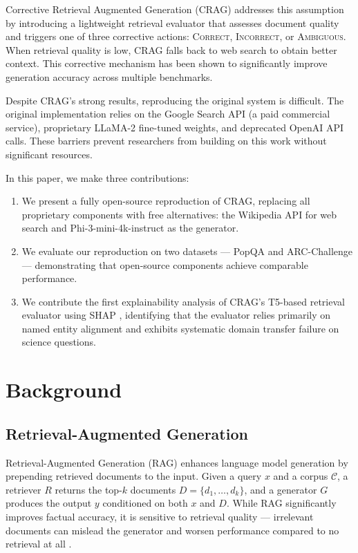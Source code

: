 \documentclass[11pt]{article}
\begin{document}
Corrective Retrieval Augmented Generation (CRAG) \cite{yan2024corrective} addresses this
assumption by introducing a lightweight retrieval evaluator that assesses document quality and
triggers one of three corrective actions: \textsc{Correct}, \textsc{Incorrect}, or
\textsc{Ambiguous}. When retrieval quality is low, CRAG falls back to web search to obtain better
context. This corrective mechanism has been shown to significantly improve generation accuracy
across multiple benchmarks.

Despite CRAG's strong results, reproducing the original system is difficult. The original
implementation relies on the Google Search API (a paid commercial service), proprietary LLaMA-2
fine-tuned weights, and deprecated OpenAI API calls. These barriers prevent researchers from
building on this work without significant resources.

In this paper, we make three contributions:
\begin{enumerate}
    \item We present a fully open-source reproduction of CRAG, replacing all proprietary
          components with free alternatives: the Wikipedia API for web search and
          Phi-3-mini-4k-instruct as the generator.
    \item We evaluate our reproduction on two datasets --- PopQA \cite{mallen2023trust} and
          ARC-Challenge \cite{bhakthavatsalam2021think} --- demonstrating that open-source
          components achieve comparable performance.
    \item We contribute the first explainability analysis of CRAG's T5-based retrieval evaluator
          using SHAP \cite{lundberg2017unified}, identifying that the evaluator relies primarily on
          named entity alignment and exhibits systematic domain transfer failure on science
          questions.
\end{enumerate}

\section{Background}

\subsection{Retrieval-Augmented Generation}
Retrieval-Augmented Generation (RAG) \cite{lewis2020retrieval} enhances language model generation
by prepending retrieved documents to the input. Given a query $x$ and a corpus $\mathcal{C}$, a
retriever $R$ returns the top-$k$ documents $D = \{d_1, \ldots, d_k\}$, and a generator $G$
produces the output $y$ conditioned on both $x$ and $D$. While RAG significantly improves factual
accuracy, it is sensitive to retrieval quality --- irrelevant documents can mislead the generator
and worsen performance compared to no retrieval at all \cite{shi2023large}.
\end{document}
